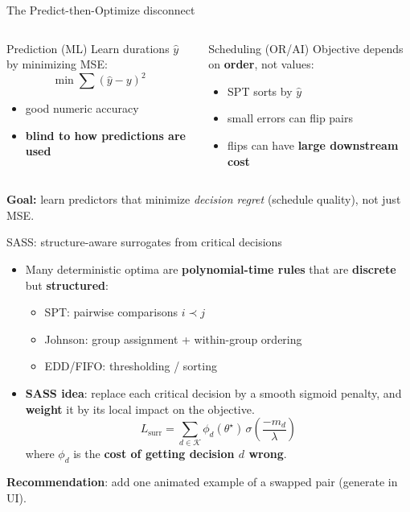\documentclass[aspectratio=169,10pt]{beamer}
\newcommand{\btext}[1]{\textbf{\color{darkred}#1}}
\begin{document}
\begin{frame}{The Predict-then-Optimize disconnect}
  \begin{columns}[T]
      \begin{block}{Prediction (ML)}
        Learn durations \(\hat{y}\) by minimizing MSE:
        \[
          \min \sum (\hat{y}-y)^2
        \]
        \vspace{-0.2cm}
        \begin{itemize}
          \item good numeric accuracy
          \item \btext{blind to how predictions are used}
        \end{itemize}
      \end{block}

      \begin{block}{Scheduling (OR/AI)}
        Objective depends on \btext{order}, not values:
        \begin{itemize}
          \item SPT sorts by \(\hat{y}\)
          \item small errors can flip pairs
          \item flips can have \btext{large downstream cost}
        \end{itemize}
      \end{block}
  \end{columns}

  \vspace{0.25cm}
  \btext{Goal:} learn predictors that minimize \emph{decision regret} (schedule quality), not just MSE.
\end{frame}

\begin{frame}{SASS: structure-aware surrogates from critical decisions}
  \begin{itemize}
    \item Many deterministic optima are \btext{polynomial-time rules} that are \btext{discrete} but \btext{structured}:
    \begin{itemize}
      \item SPT: pairwise comparisons \(i \prec j\)
      \item Johnson: group assignment + within-group ordering
      \item EDD/FIFO: thresholding / sorting
    \end{itemize}
    \item \btext{SASS idea}: replace each critical decision by a smooth sigmoid penalty,
    and \btext{weight} it by its local impact on the objective.
    \[
      L_{\mathrm{surr}} = \sum_{d \in \mathcal{K}} \phi_d(\theta^\star)\,
      \sigma\!\left(\frac{-m_d}{\lambda}\right)
    \]
    where \(\phi_d\) is the \btext{cost of getting decision \(d\) wrong}.
  \end{itemize}

  \vspace{0.2cm}
  \btext{Recommendation}: add one animated example of a swapped pair (generate in UI).
\end{frame}
\end{document}
